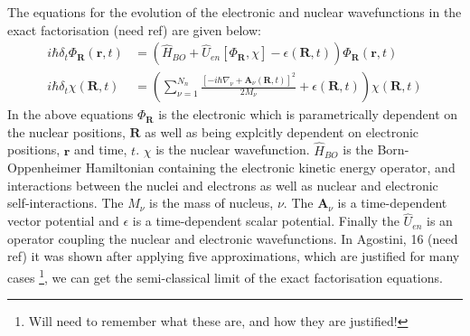The equations for the evolution of the electronic and nuclear wavefunctions in the exact factorisation (need ref) are given below:
\begin{eqnarray}
  i\hbar \delta_t \Phi_{\textbf{R}}(\textbf{r}, t) &= \left( \hat{H}_{BO} + \hat{U}_{en}\left[ \Phi_{\textbf{R}}, \chi\right] - \epsilon(\textbf{R}, t) \right) \Phi_{\textbf{R}} (\textbf{r}, t)
  \label{eq:electronic_exact}
\\
  i\hbar \delta_t \chi (\textbf{R}, t) &= \left( \sum_{\nu = 1}^{N_{n}} \frac{[-i\hbar\nabla_{\nu} + \textbf{A}_{\nu}(\textbf{R}, t)]^2}{2 M_{\nu}} + \epsilon(\textbf{R}, t)\right) \chi (\textbf{R}, t)
  \label{eq:nuclear_exact}
\end{eqnarray}
In the above equations $\Phi_{\textbf{R}}$ is the electronic which is parametrically dependent on the nuclear positions, $\textbf{R}$ as well as being explcitly dependent on electronic positions, $\textbf{r}$ and time, $t$. $\chi$ is the nuclear wavefunction. $\hat{H}_{BO}$ is the Born-Oppenheimer Hamiltonian containing the electronic kinetic energy operator, and interactions between the nuclei and electrons as well as nuclear and electronic self-interactions. The $M_{\nu}$ is the mass of nucleus, $\nu$. The $\textbf{A}_{\nu}$ is a time-dependent vector potential and $\epsilon$ is a time-dependent scalar potential. Finally the $\hat{U}_{en}$ is an operator coupling the nuclear and electronic wavefunctions. In Agostini, 16 (need ref) it was shown after applying five approximations, which are justified for many cases \footnote{Will need to remember what these are, and how they are justified!}, we can get the semi-classical limit of the exact factorisation equations.



\newpage



